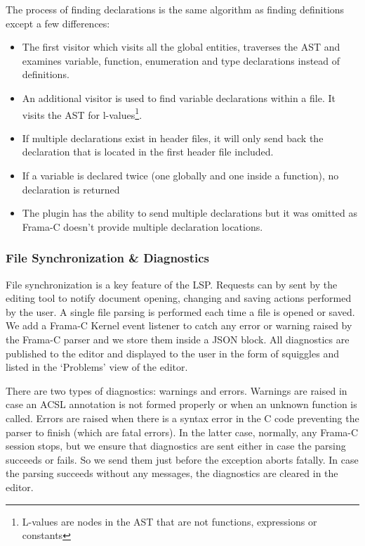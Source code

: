 \documentclass[10pt]{article}
\begin{document}
\begin{singlespace}
The process of finding declarations is the same algorithm as finding definitions except a few differences:
\begin{itemize}
	\item[--] The first visitor which visits all the global entities, traverses the AST and examines variable, function, enumeration and type declarations instead of definitions.
	\item[--] An additional visitor is used to find variable declarations within a file. It visits the AST for l-values\footnote{L-values are nodes in the AST that are not functions, expressions or constants}.
	\item[--] If multiple declarations exist in header files, it will only send back the declaration that is located in the first header file included.
	\item[--] If a variable is declared twice (one globally and one inside a function), no declaration is returned
	\item[--] The plugin has the ability to send multiple declarations but it was omitted as Frama-C doesn't provide multiple declaration locations.
\end{itemize}

\subsubsection{File Synchronization \& Diagnostics}
File synchronization is a key feature of the LSP\@. Requests can by sent by the editing tool to notify document opening, changing and saving actions performed by the user. 
A single file parsing is performed each time a file is opened or saved. We add a Frama-C Kernel event listener to catch any error or warning raised by the Frama-C parser and we store them inside a JSON block.
All diagnostics are published to the editor and displayed to the user in the form of squiggles and listed in the `Problems' view of the editor.

There are two types of diagnostics: warnings and errors.
Warnings are raised in case an ACSL annotation is not formed properly or when an unknown function is called.
Errors are raised when there is a syntax error in the C code preventing the parser to finish (which are fatal errors).
In the latter case, normally, any Frama-C session stops, but we ensure that diagnostics are sent either in case the parsing succeeds or fails.
So we send them just before the exception aborts fatally.
In case the parsing succeeds without any messages, the diagnostics are cleared in the editor.


\end{singlespace}
\end{document}
